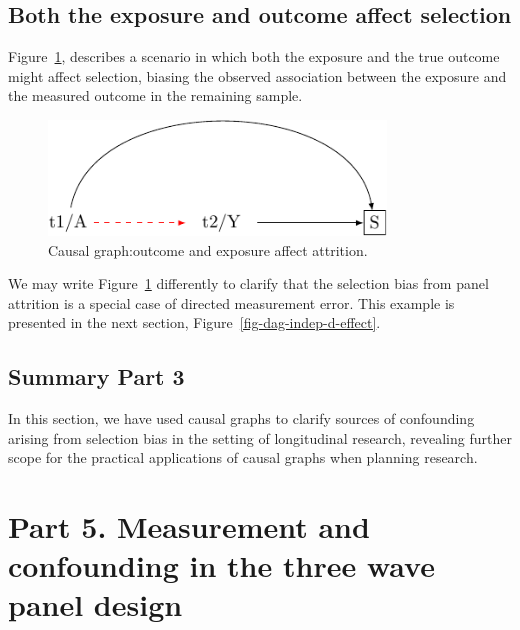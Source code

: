 \documentclass[
  singlecolumn]{report}
\begin{document}
\hypertarget{both-the-exposure-and-outcome-affect-selection}{%
\subsection{Both the exposure and outcome affect
selection}\label{both-the-exposure-and-outcome-affect-selection}}

Figure~\ref{fig-dag-8-5}, describes a scenario in which both the
exposure and the true outcome might affect selection, biasing the
observed association between the exposure and the measured outcome in
the remaining sample.

\begin{figure}

{\centering \includegraphics[width=0.8\textwidth,height=\textheight]{causal-dags_files/figure-pdf/fig-dag-8-5-1.pdf}

}

\caption{\label{fig-dag-8-5}Causal graph:outcome and exposure affect
attrition.}

\end{figure}

We may write Figure~\ref{fig-dag-8-5} differently to clarify that the
selection bias from panel attrition is a special case of directed
measurement error. This example is presented in the next section,
Figure~\ref{fig-dag-indep-d-effect}.

\hypertarget{summary-part-3}{%
\subsection{Summary Part 3}\label{summary-part-3}}

In this section, we have used causal graphs to clarify sources of
confounding arising from selection bias in the setting of longitudinal
research, revealing further scope for the practical applications of
causal graphs when planning research.

\hypertarget{part-5.-measurement-and-confounding-in-the-three-wave-panel-design}{%
\section{Part 5. Measurement and confounding in the three wave panel
design}\label{part-5.-measurement-and-confounding-in-the-three-wave-panel-design}}
\end{document}
